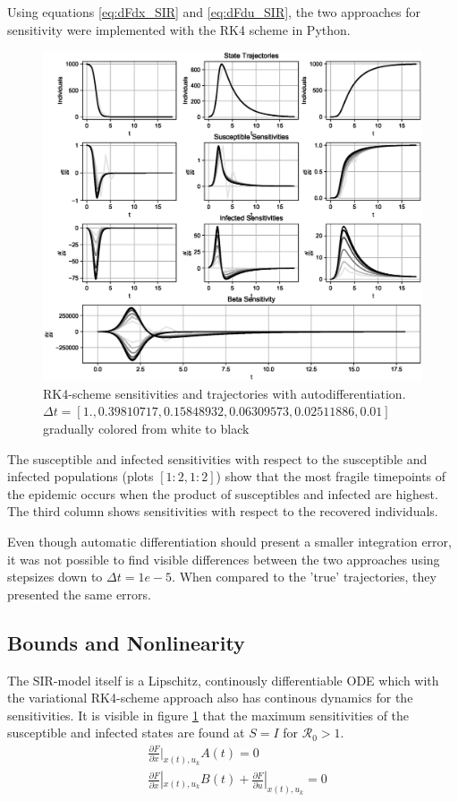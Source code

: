 Using equations \ref{eq:dFdx_SIR} and \ref{eq:dFdu_SIR}, the two approaches for sensitivity were implemented with the RK4 scheme in Python.

\begin{figure}[h]
    \centering
    \includegraphics[width=.9\linewidth]{Figures/Autodiff_Sensitivities.eps}
    \caption{RK4-scheme sensitivities and trajectories with autodifferentiation. $\Delta t = [1.        , 0.39810717, 0.15848932, 0.06309573, 0.02511886,
       0.01      ]$ gradually colored from white to black}
    \label{fig:RK4_Autodiff}
\end{figure}

The susceptible and infected sensitivities with respect to the susceptible and infected populations (plots $[1:2,1:2]$) show that the most fragile timepoints of the epidemic occurs when the product of susceptibles and infected are highest. The third column shows sensitivities with respect to the recovered individuals.

Even though automatic differentiation should present a smaller integration error, it was not possible to find visible differences between the two approaches using stepsizes down to $\Delta t = 1e-5$. When compared to the 'true' trajectories, they presented the same errors.
\newpage
\iffalse
\subsection{Bounds and Nonlinearity}
The SIR-model itself is a Lipschitz, continously differentiable ODE which with the variational RK4-scheme approach also has continous dynamics for the sensitivities. It is visible in figure \ref{fig:RK4_Autodiff} that the maximum sensitivities of the susceptible and infected states are found at $S = I$ for $\mathscr{R}_0 > 1$.
\iffalse
\begin{align}
        &\frac{\partial F}{\partial x}|_{x(t),u_k} A(t) = 0\\
 &\frac{\partial F}{\partial x}|_{x(t), u_k} B(t) + \frac{\partial F}{\partial u}|_{x(t), u_k} = 0
\end{align}

